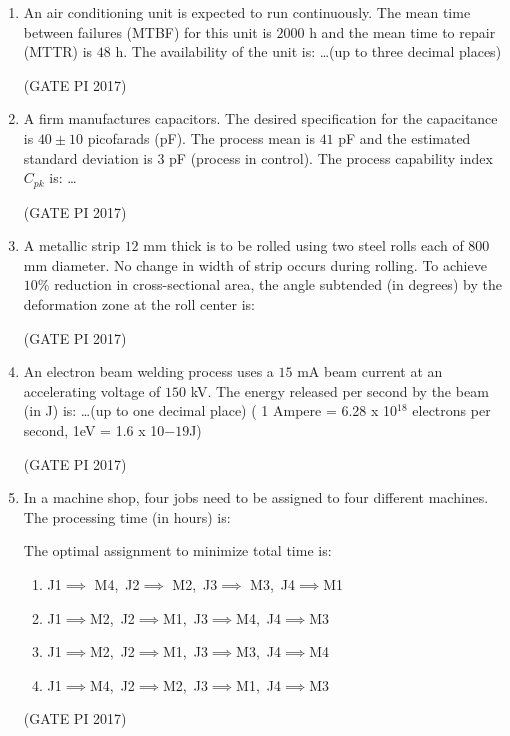 \documentclass[journal,12pt,onecolumn]{IEEEtran}
\theoremstyle{remark}
\begin{document}
\begin{enumerate}
\item An air conditioning unit is expected to run continuously. The mean time between failures (MTBF) for this unit is $2000$ h and the mean time to repair (MTTR) is $48$ h.  
The availability of the unit is:  
\dots(up to three decimal places)  

\hfill (GATE PI 2017)

\item A firm manufactures capacitors. The desired specification for the capacitance is $40 \pm 10$ picofarads (pF).  
The process mean is $41$ pF and the estimated standard deviation is $3$ pF (process in control).  
The process capability index $C_{pk}$ is:  
\dots

\hfill (GATE PI 2017)

\item A metallic strip $12$ mm thick is to be rolled using two steel rolls each of $800$ mm diameter.  
No change in width of strip occurs during rolling.  
To achieve $10\%$ reduction in cross\--sectional area, the angle subtended (in degrees) by the deformation zone at the roll center is:
\begin{enumerate}
\end{enumerate}

\hfill (GATE PI 2017)

\item An electron beam welding process uses a $15$ mA beam current at an accelerating voltage of $150$ kV.  
The energy released per second by the beam (in J) is:  
\dots (up to one decimal place) ( 1 Ampere = 6.28 x 10$^{18}$ electrons per second, 1eV = 1.6 x 10$-19$J)  

\hfill (GATE PI 2017)

\item In a machine shop, four jobs need to be assigned to four different machines. The processing time (in hours) is:



The optimal assignment to minimize total time is:
\begin{enumerate}
\item J1$\implies$ M4,\ J2$\implies$ M2,\ J3$\implies$ M3,\ J4$\implies$M1
\item J1$\implies$M2,\ J2$\implies$M1,\ J3$\implies$M4,\ J4$\implies$M3
\item J1$\implies$M2,\ J2$\implies$M1,\ J3$\implies$M3,\ J4$\implies$M4
\item J1$\implies$M4,\ J2$\implies$M2,\ J3$\implies$M1,\ J4$\implies$M3
\end{enumerate}
\hfill (GATE PI 2017)


\end{enumerate}
\end{document}
